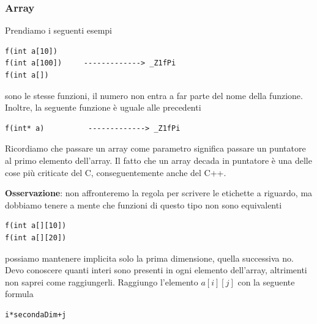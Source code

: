 \documentclass[11pt]{report}
\theoremstyle{definition}
\begin{document}
\subsubsection{Array}
Prendiamo i seguenti esempi
\begin{verbatim}
f(int a[10])
f(int a[100])     -------------> _Z1fPi
f(int a[])
\end{verbatim}
sono le stesse funzioni, il numero non entra a far parte del nome della funzione. Inoltre, la seguente funzione è uguale alle precedenti
\begin{verbatim}
f(int* a)          -------------> _Z1fPi
\end{verbatim}
Ricordiamo che passare un array come parametro significa passare un puntatore al primo elemento dell'array. Il fatto che un array decada in puntatore è una delle cose più criticate del C, conseguentemente anche del C++.\begin{framed}\noindent \textbf{Osservazione}: non affronteremo la regola per scrivere le etichette a riguardo, ma dobbiamo tenere a mente che funzioni di questo tipo non sono equivalenti
\begin{verbatim}
f(int a[][10])
f(int a[][20])
\end{verbatim} 
possiamo mantenere implicita solo la prima dimensione, quella successiva no. Devo conoscere quanti interi sono presenti in ogni elemento dell'array, altrimenti non saprei come raggiungerli. Raggiungo l'elemento $a[i][j]$ con la seguente formula
\begin{verbatim}
i*secondaDim+j
\end{verbatim}
\end{framed}
\end{document}
